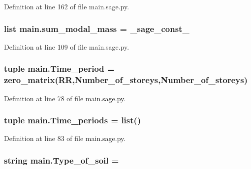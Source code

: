 Definition at line 162 of file main.\+sage.\+py.

\hypertarget{a00039_a27fb93072b84fd448623807df350f132}{}
\subsubsection[{sum\+\_\+modal\+\_\+mass}]{\setlength{\rightskip}{0pt plus 5cm}list main.\+sum\+\_\+modal\+\_\+mass = \+\_\+sage\+\_\+const\+\_}\label{a00039_a27fb93072b84fd448623807df350f132}


Definition at line 109 of file main.\+sage.\+py.

\hypertarget{a00039_a76fa8360c88818d30b9b5d2a473e79e4}{}
\subsubsection[{Time\+\_\+period}]{\setlength{\rightskip}{0pt plus 5cm}tuple main.\+Time\+\_\+period = zero\+\_\+matrix(R\+R,Number\+\_\+of\+\_\+storeys,Number\+\_\+of\+\_\+storeys)}\label{a00039_a76fa8360c88818d30b9b5d2a473e79e4}


Definition at line 78 of file main.\+sage.\+py.

\hypertarget{a00039_afe9c3a972582e300106b7dec57600887}{}
\subsubsection[{Time\+\_\+periods}]{\setlength{\rightskip}{0pt plus 5cm}tuple main.\+Time\+\_\+periods = list()}\label{a00039_afe9c3a972582e300106b7dec57600887}


Definition at line 83 of file main.\+sage.\+py.

\hypertarget{a00039_a52e65712caa18dade1326ad4efeebfa1}{}
\subsubsection[{Type\+\_\+of\+\_\+soil}]{\setlength{\rightskip}{0pt plus 5cm}string main.\+Type\+\_\+of\+\_\+soil = \textquotesingle{}\textquotesingle{}}\label{a00039_a52e65712caa18dade1326ad4efeebfa1}


